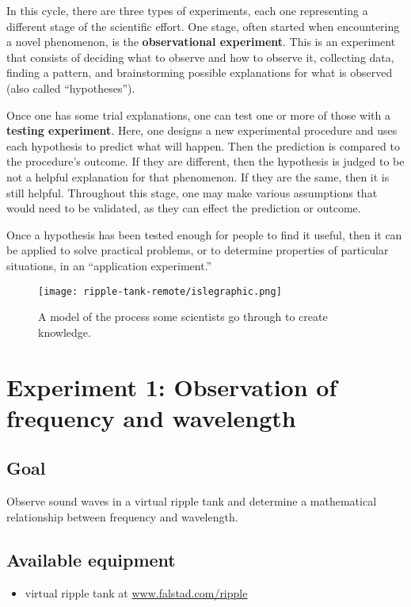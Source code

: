 In this cycle, there are three types of experiments, each one representing a different stage of the scientific effort. One stage, often started when encountering a novel phenomenon, is the \textbf{observational experiment}. This is an experiment that consists of deciding what to observe and how to observe it, collecting data, finding a pattern, and brainstorming possible explanations for what is observed (also called ``hypotheses'').

Once one has some trial explanations, one can test one or more of those with a \textbf{testing experiment}. Here, one designs a new experimental procedure and uses each hypothesis to predict what will happen. Then the prediction is compared to the procedure's outcome. If they are different, then the hypothesis is judged to be not a helpful explanation for that phenomenon. If they are the same, then it is still helpful. Throughout this stage, one may make various assumptions that would need to be validated, as they can effect the prediction or outcome.

Once a hypothesis has been tested enough for people to find it useful, then it can be applied to solve practical problems, or to determine properties of particular situations, in an ``application experiment.''

\begin{figure}
	\centering
	\texttt{[image: ripple-tank-remote/islegraphic.png]}
	\caption{A model of the process some scientists go through to create knowledge.\cite{etkina_millikan_2015}}\label{me:fig:isle}
\end{figure}

\section{Experiment 1: Observation of frequency and wavelength}

\subsection{Goal}

Observe sound waves in a virtual ripple tank and determine a mathematical relationship between frequency and wavelength.

\subsection{Available equipment}

\begin{itemize}
	\item virtual ripple tank at \url{www.falstad.com/ripple}
\end{itemize}

